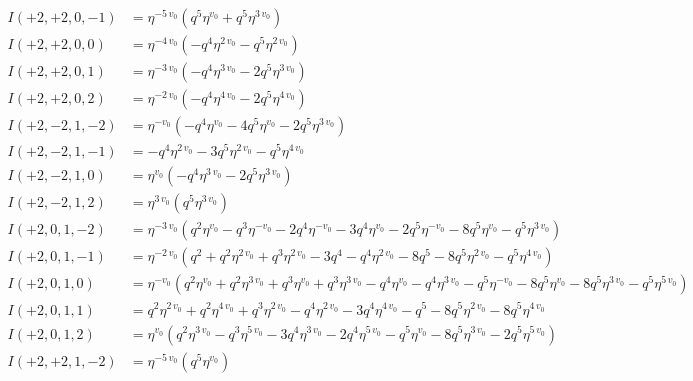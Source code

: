 \documentclass{article}
\begin{document}
\begin{align*}
I(+2, +2, 0, -1) &= \eta^{-5 \, v_{0}} \left( q^{5} \eta^{v_{0}} + q^{5} \eta^{3 \, v_{0}} \right) \\
I(+2, +2, 0, 0) &= \eta^{-4 \, v_{0}} \left( -q^{4} \eta^{2 \, v_{0}} - q^{5} \eta^{2 \, v_{0}} \right) \\
I(+2, +2, 0, 1) &= \eta^{-3 \, v_{0}} \left( -q^{4} \eta^{3 \, v_{0}} - 2 q^{5} \eta^{3 \, v_{0}} \right) \\
I(+2, +2, 0, 2) &= \eta^{-2 \, v_{0}} \left( -q^{4} \eta^{4 \, v_{0}} - 2 q^{5} \eta^{4 \, v_{0}} \right) \\
I(+2, -2, 1, -2) &= \eta^{-v_{0}} \left( -q^{4} \eta^{v_{0}} - 4 q^{5} \eta^{v_{0}} - 2 q^{5} \eta^{3 \, v_{0}} \right) \\
I(+2, -2, 1, -1) &= -q^{4} \eta^{2 \, v_{0}} - 3 q^{5} \eta^{2 \, v_{0}} - q^{5} \eta^{4 \, v_{0}} \\
I(+2, -2, 1, 0) &= \eta^{v_{0}} \left( -q^{4} \eta^{3 \, v_{0}} - 2 q^{5} \eta^{3 \, v_{0}} \right) \\
I(+2, -2, 1, 2) &= \eta^{3 \, v_{0}} \left( q^{5} \eta^{3 \, v_{0}} \right) \\
I(+2, 0, 1, -2) &= \eta^{-3 \, v_{0}} \left( q^{2} \eta^{v_{0}} - q^{3} \eta^{-v_{0}} - 2 q^{4} \eta^{-v_{0}} - 3 q^{4} \eta^{v_{0}} - 2 q^{5} \eta^{-v_{0}} - 8 q^{5} \eta^{v_{0}} - q^{5} \eta^{3 \, v_{0}} \right) \\
I(+2, 0, 1, -1) &= \eta^{-2 \, v_{0}} \left( q^{2} + q^{2} \eta^{2 \, v_{0}} + q^{3} \eta^{2 \, v_{0}} - 3 q^{4} - q^{4} \eta^{2 \, v_{0}} - 8 q^{5} - 8 q^{5} \eta^{2 \, v_{0}} - q^{5} \eta^{4 \, v_{0}} \right) \\
I(+2, 0, 1, 0) &= \eta^{-v_{0}} \left( q^{2} \eta^{v_{0}} + q^{2} \eta^{3 \, v_{0}} + q^{3} \eta^{v_{0}} + q^{3} \eta^{3 \, v_{0}} - q^{4} \eta^{v_{0}} - q^{4} \eta^{3 \, v_{0}} - q^{5} \eta^{-v_{0}} - 8 q^{5} \eta^{v_{0}} - 8 q^{5} \eta^{3 \, v_{0}} - q^{5} \eta^{5 \, v_{0}} \right) \\
I(+2, 0, 1, 1) &= q^{2} \eta^{2 \, v_{0}} + q^{2} \eta^{4 \, v_{0}} + q^{3} \eta^{2 \, v_{0}} - q^{4} \eta^{2 \, v_{0}} - 3 q^{4} \eta^{4 \, v_{0}} - q^{5} - 8 q^{5} \eta^{2 \, v_{0}} - 8 q^{5} \eta^{4 \, v_{0}} \\
I(+2, 0, 1, 2) &= \eta^{v_{0}} \left( q^{2} \eta^{3 \, v_{0}} - q^{3} \eta^{5 \, v_{0}} - 3 q^{4} \eta^{3 \, v_{0}} - 2 q^{4} \eta^{5 \, v_{0}} - q^{5} \eta^{v_{0}} - 8 q^{5} \eta^{3 \, v_{0}} - 2 q^{5} \eta^{5 \, v_{0}} \right) \\
I(+2, +2, 1, -2) &= \eta^{-5 \, v_{0}} \left( q^{5} \eta^{v_{0}} \right) \\

\end{align*}
\end{document}

